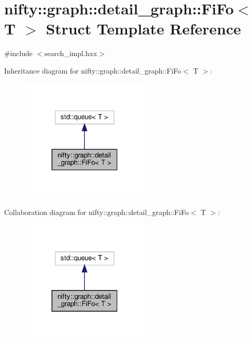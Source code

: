 \hypertarget{structnifty_1_1graph_1_1detail__graph_1_1FiFo}{}\section{nifty\+:\+:graph\+:\+:detail\+\_\+graph\+:\+:Fi\+Fo$<$ T $>$ Struct Template Reference}
\label{structnifty_1_1graph_1_1detail__graph_1_1FiFo}


{\ttfamily \#include $<$search\+\_\+impl.\+hxx$>$}



Inheritance diagram for nifty\+:\+:graph\+:\+:detail\+\_\+graph\+:\+:Fi\+Fo$<$ T $>$\+:
\nopagebreak
\begin{figure}[H]
\begin{center}
\leavevmode
\includegraphics[width=175pt]{structnifty_1_1graph_1_1detail__graph_1_1FiFo__inherit__graph}
\end{center}
\end{figure}


Collaboration diagram for nifty\+:\+:graph\+:\+:detail\+\_\+graph\+:\+:Fi\+Fo$<$ T $>$\+:
\nopagebreak
\begin{figure}[H]
\begin{center}
\leavevmode
\includegraphics[width=175pt]{structnifty_1_1graph_1_1detail__graph_1_1FiFo__coll__graph}
\end{center}
\end{figure}
